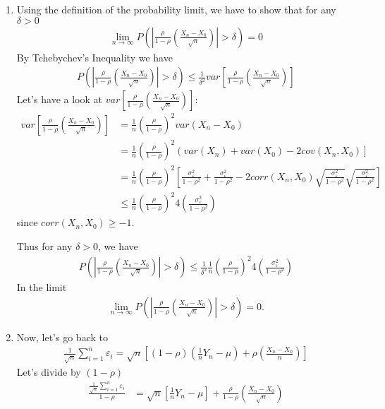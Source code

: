 \documentclass{article}
\begin{document}
\begin{solution}
\begin{enumerate}
\begin{enumerate}
    \item Using the definition of the probability limit, we have to show that for any $\delta>0$
        \begin{align*}
          \lim_{n\rightarrow \infty} P\left(\left|\frac{\rho}{1-\rho}\left(\frac{X_n - X_0}{\sqrt{n}}\right)\right|> \delta\right) = 0
        \end{align*}
        By Tchebychev's Inequality we have
        \begin{align*}
        P\left(\left|\frac{\rho}{1-\rho}\left(\frac{X_n - X_0}{\sqrt{n}}\right)\right|> \delta\right) \leq \frac{1}{\delta^2} var\left[\frac{\rho}{1-\rho}\left(\frac{X_n - X_0}{\sqrt{n}}\right)\right]
        \end{align*}
        Let's have a look at $var\left[\frac{\rho}{1-\rho}\left(\frac{X_n - X_0}{\sqrt{n}}\right)\right]$:
        \begin{align*}
        var\left[\frac{\rho}{1-\rho}\left(\frac{X_n - X_0}{\sqrt{n}}\right)\right]
        &= \frac{1}{n}\left(\frac{\rho}{1-\rho}\right)^2 var(X_n - X_0)\\
        &= \frac{1}{n}\left(\frac{\rho}{1-\rho}\right)^2 \left(var(X_n) + var(X_0) - 2 cov(X_n,X_0)\right]\\
        &= \frac{1}{n}\left(\frac{\rho}{1-\rho}\right)^2 \left[\frac{\sigma_\varepsilon^2}{1-\rho^2} + \frac{\sigma_\varepsilon^2}{1-\rho^2} - 2 corr(X_n,X_0)\sqrt{\frac{\sigma_\varepsilon^2}{1-\rho^2}}\sqrt{\frac{\sigma_\varepsilon^2}{1-\rho^2}} \right]\\
        &\leq \frac{1}{n}\left(\frac{\rho}{1-\rho}\right)^2 4 \left(\frac{\sigma_\varepsilon^2}{1-\rho^2}\right)
        \end{align*}
        since $corr(X_n,X_0) \geq -1$.

        Thus for any $\delta>0$, we have
        \begin{align*}
        P\left(\left|\frac{\rho}{1-\rho}\left(\frac{X_n - X_0}{\sqrt{n}}\right)\right|> \delta\right) \leq \frac{1}{\delta^2} \frac{1}{n}\left(\frac{\rho}{1-\rho}\right)^2 4 \left(\frac{\sigma_\varepsilon^2}{1-\rho^2}\right)
        \end{align*}
        In the limit
        \begin{align*}
        \lim_{n\rightarrow \infty} P\left(\left|\frac{\rho}{1-\rho}\left(\frac{X_n - X_0}{\sqrt{n}}\right)\right|> \delta\right) = 0.
        \end{align*}

    \item Now, let's go back to
            \begin{align*}
            \frac{1}{\sqrt{n}} \sum_{i=1}^n \varepsilon_i = \sqrt{n}\left[(1-\rho)\left(\frac{1}{n}Y_n-\mu\right) + \rho\left(\frac{X_n - X_0}{n}\right)\right]
            \end{align*}
            Let's divide by $(1-\rho)$
        \begin{align*}
        \frac{\frac{1}{\sqrt{n}} \sum_{i=1}^n \varepsilon_i}{1-\rho} & = \sqrt{n}\left[\frac{1}{n}Y_n-\mu\right] + \frac{\rho}{1-\rho}\left(\frac{X_n - X_0}{\sqrt{n}}\right)
        \end{align*}


\end{enumerate}
\end{enumerate}
\end{solution}
\end{document}
